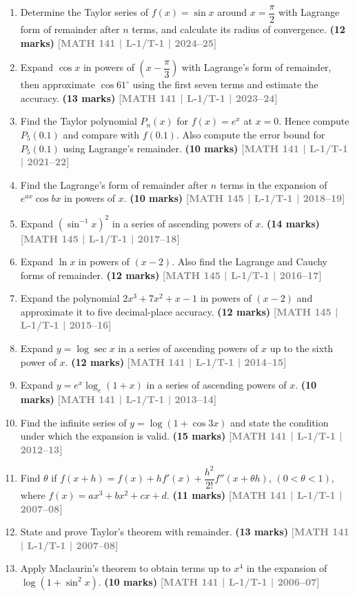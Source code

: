 \documentclass[12pt,a3paper]{article}
\newcommand{\yr}[1]{\hfill\textcolor{gray}{\small\textbf{[#1]}}}
\newcommand{\mk}[1]{\textcolor{orange!70!black}{\small\textbf{(#1 marks)}}}
\begin{document}
\begin{enumerate}

\item  Determine the Taylor series of $f(x)=\sin x$ around
    $x=\dfrac{\pi}{2}$ with Lagrange form of remainder after $n$ terms,
    and calculate its radius of convergence.
 \mk{12} \yr{MATH 141 | L-1/T-1 | 2024--25}


    
\item Expand $\cos x$ in powers of $\left(x-\dfrac{\pi}{3}\right)$ with Lagrange's form of remainder, then approximate $\cos 61^{\circ}$ using the first seven terms and estimate the accuracy.
\mk{13} \yr{MATH 141 | L-1/T-1 | 2023--24}

\item Find the Taylor polynomial $P_{n}(x)$ for $f(x)=e^{x}$ at $x=0$. Hence compute $P_{5}(0.1)$ and compare with $f(0.1)$. Also compute the error bound for $P_{5}(0.1)$ using Lagrange's remainder.
\mk{10} \yr{MATH 141 | L-1/T-1 | 2021--22}

\item Find the Lagrange's form of remainder after $n$ terms in the expansion of $e^{ax}\cos bx$ in powers of $x$.
\mk{10} \yr{MATH 145 | L-1/T-1 | 2018--19}

\item Expand $(\sin^{-1}x)^{2}$ in a series of ascending powers of $x$.
\mk{14} \yr{MATH 145 | L-1/T-1 | 2017--18}

\item Expand $\ln x$ in powers of $(x-2)$. Also find the Lagrange and Cauchy forms of remainder.
\mk{12} \yr{MATH 145 | L-1/T-1 | 2016--17}

\item Expand the polynomial $2x^{3}+7x^{2}+x-1$ in powers of $(x-2)$ and approximate it to five decimal-place accuracy.
\mk{12} \yr{MATH 145 | L-1/T-1 | 2015--16}

\item Expand $y=\log\sec x$ in a series of ascending powers of $x$ up to the sixth power of $x$.
\mk{12} \yr{MATH 141 | L-1/T-1 | 2014--15}

\item Expand $y=e^{x}\log_{e}(1+x)$ in a series of ascending powers of $x$.
\mk{10} \yr{MATH 141 | L-1/T-1 | 2013--14}

\item Find the infinite series of $y=\log(1+\cos 3x)$ and state the condition under which the expansion is valid.
\mk{15} \yr{MATH 141 | L-1/T-1 | 2012--13}

\item Find $\theta$ if $f(x+h)=f(x)+hf'(x)+\dfrac{h^{2}}{2!}f''(x+\theta h)$, $(0<\theta<1)$, where $f(x)=ax^{3}+bx^{2}+cx+d$.
\mk{11} \yr{MATH 141 | L-1/T-1 | 2007--08}

\item State and prove Taylor's theorem with remainder.
\mk{13} \yr{MATH 141 | L-1/T-1 | 2007--08}

\item Apply Maclaurin's theorem to obtain terms up to $x^{4}$ in the expansion of $\log(1+\sin^{2}x)$.
\mk{10} \yr{MATH 141 | L-1/T-1 | 2006--07}

\end{enumerate}
\end{document}

